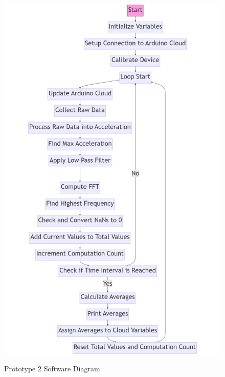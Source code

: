 \begin{figure}[H]
	\centering
	\caption{Prototype 2 Software Diagram}
	\includegraphics[width=\textwidth]{Sections/Design-Process/proto2-soft-diagram.png}
	\label{proto2-soft-diagram}
\end{figure}

